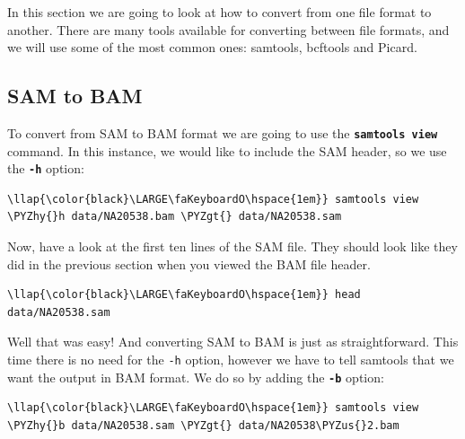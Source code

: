 \documentclass[11pt]{article}
\def\PYZus{\char`\_}
\def\PYZgt{\char`\>}
\def\PYZhy{\char`\-}
\begin{document}
In this section we are going to look at how to convert from one file
format to another. There are many tools available for converting between
file formats, and we will use some of the most common ones: samtools,
bcftools and Picard.

\hypertarget{sam-to-bam}{%
\subsection{SAM to BAM}\label{sam-to-bam}}

To convert from SAM to BAM format we are going to use the
\textbf{\texttt{samtools\ view}} command. In this instance, we would
like to include the SAM header, so we use the \textbf{\texttt{-h}}
option:

\begin{terminalinput}
\begin{Verbatim}[commandchars=\\\{\}]
\llap{\color{black}\LARGE\faKeyboardO\hspace{1em}} samtools view \PYZhy{}h data/NA20538.bam \PYZgt{} data/NA20538.sam
\end{Verbatim}
\end{terminalinput}

    Now, have a look at the first ten lines of the SAM file. They should
look like they did in the previous section when you viewed the BAM file
header.

\begin{terminalinput}
\begin{Verbatim}[commandchars=\\\{\}]
\llap{\color{black}\LARGE\faKeyboardO\hspace{1em}} head data/NA20538.sam
\end{Verbatim}
\end{terminalinput}

    Well that was easy! And converting SAM to BAM is just as
straightforward. This time there is no need for the \texttt{-h} option,
however we have to tell samtools that we want the output in BAM format.
We do so by adding the \textbf{\texttt{-b}} option:

\begin{terminalinput}
\begin{Verbatim}[commandchars=\\\{\}]
\llap{\color{black}\LARGE\faKeyboardO\hspace{1em}} samtools view \PYZhy{}b data/NA20538.sam \PYZgt{} data/NA20538\PYZus{}2.bam
\end{Verbatim}
\end{terminalinput}
\end{document}
